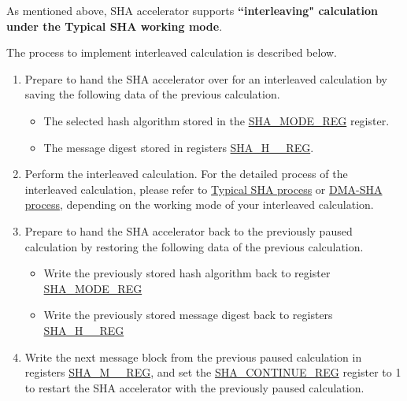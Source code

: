 \label{others:sha-interleaved}As mentioned above, \chipname{} SHA accelerator supports \textbf{``interleaving" calculation under the Typical SHA working mode}. 

The process to implement interleaved calculation is described below.

\begin{enumerate}
    \item Prepare to hand the SHA accelerator over for an interleaved calculation by saving the following data of the previous calculation.
        \begin{itemize}
            \item The selected hash algorithm stored in the \hyperref[regdesc:SHAMODEREG]{SHA\_MODE\_REG} register.
            \item The message digest stored in registers \hyperref[regdesc:SHAHNREG]{SHA\_H\_\_REG}.
        \end{itemize}
    \item Perform the interleaved calculation. For the detailed process of the interleaved calculation, please refer to \hyperref[sec:sha-typical-sha]{Typical SHA process} or \hyperref[sec:sha-dma-sha]{DMA-SHA process}, depending on the working mode of your interleaved calculation.
    \item Prepare to hand the SHA accelerator back to the previously paused calculation by restoring the following data of the previous calculation.
        \begin{itemize}
            \item Write the previously stored hash algorithm back to register \hyperref[regdesc:SHAMODEREG]{SHA\_MODE\_REG}
            \item Write the previously stored message digest back to registers \hyperref[regdesc:SHAHNREG]{SHA\_H\_\_REG}
        \end{itemize}
    \item Write the next message block from the previous paused calculation in registers \hyperref[regdesc:SHAMNREG]{SHA\_M\_\_REG}, and set the \hyperref[regdesc:SHACONTINUEREG]{SHA\_CONTINUE\_REG} register to 1 to restart the SHA accelerator with the previously paused calculation. 
\end{enumerate}

